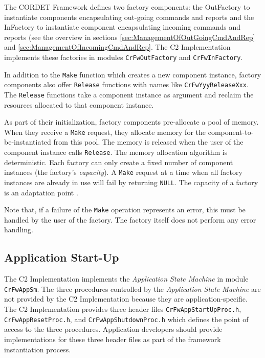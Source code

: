 \documentclass{pnp_article}
\begin{document}
The CORDET Framework defines two factory components: the OutFactory to instantiate components encapsulating out-going commands and reports and the InFactory to instantiate component encapsulating incoming commands and reports (see the overview in sections \ref{sec:ManagementOfOutGoingCmdAndRep} and \ref{sec:ManagementOfIncomingCmdAndRep}. The C2 Implementation implements these factories in modules \texttt{CrFwOutFactory} and \texttt{CrFwInFactory}. 

In addition to the \texttt{Make} function which creates a new component instance, factory components also offer \texttt{Release} functions with names like \texttt{CrFwYyyReleaseXxx}. The \texttt{Release} functions take a component instance as argument and reclaim the resources allocated to that component instance.

As part of their initialization, factory components pre-allocate a pool of memory. When they receive a \texttt{Make} request, they allocate memory for the component-to-be-instantiated from this pool. The memory is released when the user of the component instance calls \texttt{Release}. The memory allocation algorithm is deterministic. Each factory can only create a fixed number of component instances (the factory's \textit{capacity}). A \texttt{Make} request at a time when all factory instances are already in use will fail by returning \texttt{NULL}. The capacity of a factory is an adaptation point .


Note that, if a failure of the \texttt{Make} operation represents an error, this must be handled by the user of the factory. The factory itself does not perform any error handling.

\subsection{Application Start-Up}\label{sec:AppStartUp}


The C2 Implementation implements the \textit{Application State Machine} in module \texttt{CrFwAppSm}. The three procedures controlled by the \textit{Application State Machine} are not provided by the C2 Implementation because they are application-specific. The C2 Implementation provides three header files \texttt{CrFwAppStartUpProc.h}, \texttt{CrFwAppResetProc.h}, and \texttt{CrFwAppShutdownProc.h} which defines the point of access to the three procedures. Application developers should provide implementations for these three header files as part of the framework instantiation process.
\end{document}
